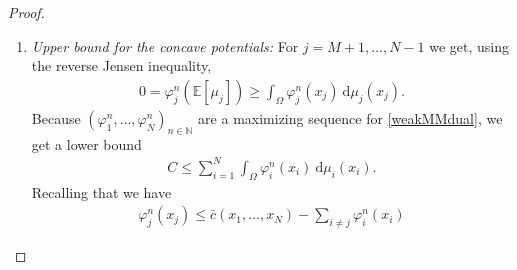 \documentclass[10pt,a4paper]{amsart}
\newcommand{\RR}{\mathbb{R}}
\newcommand{\NN}{\mathbb{N}}
\newcommand{\EE}{\mathbb{E}}
\newcommand{\dd}{\mathrm{d}}
\begin{document}
\begin{proof}
\begin{enumerate}
\begin{align*}
		\varphi_j^n(x_j)&\geq-\big(\lambda_j|\cdot|^p\big)^*(0)-\Big(\sum_{i\ne j}\inf_{x_i\in\Omega}\lambda_i|x_i-\cdot|^p-\varphi_i^n(x_i)\Big)^*(0)\\
		&=-\sup_{v_1\in\Omega}-\lambda_j|v_1|^p-\sup_{v_2\in\Omega}-\sum_{i\neq j}\inf_{x_i\in\Omega}\lambda_i|x_i-v_2|^p-\varphi_i^n(x_i)\\
		&=\inf_{v_1\in\Omega}\lambda_j|v_1|^p+\inf_{v_2\in\Omega}\sum_{i\neq j}\inf_{x_i\in\Omega}\lambda_i|x_i-v_2|^p-\varphi_i^n(x_i)\\
		&=\inf_{v_2\in\Omega}\sum_{i\neq j}\inf_{x_i\in\Omega}\lambda_i|x_i-v_2|^p-\varphi_i^n(x_i)=:C_1(n)
	\end{align*}
	and we also get
	\begin{align*}
		\varphi_j^n(x_j)&\leq\inf_{z\in\Omega}\lambda_j|x_j-z|^p+\sum_{i\neq j}\inf_{x_i\in\Omega}\lambda_i|x_i-z|^p-\varphi_i^n(x_i)\\
		&\leq \inf_{z\in\Omega}\lambda_j\text{diam}(\Omega)^p+\sum_{i\neq j}\inf_{x_i\in\Omega}\lambda_i|x_i-z|^p-\varphi_i^n(x_i)=:C+C_1(n)
	\end{align*}
	for some $C>0$ and we notice that $C_1(n)\in[-\infty,+\infty]$ does not depend on $x_j$ anymore.
	Because of $0=\varphi_j^n(\EE[\mu_j])$ we get
	\begin{gather*}
		C_1(n)\leq 0\leq C+C_1(n).
	\end{gather*}
	which shows equivalently that
	\begin{gather*}
		-C\leq C_1(n)\leq 0
	\end{gather*}
	and that therefore $-C\leq\varphi_j^n(x_j)\leq C$ with $C\in\RR$ independent of $n$ and $x_j$ (and it shows that replacing $\varphi_j^n$ by the bi-conjugate preserves continuity).
	\item \textit{Upper bound for the concave potentials:}
	For $j=M+1,\dots,N-1$ we get, using the reverse Jensen inequality,
	\begin{gather}\label{integralbound}
		0=\varphi_j^n(\EE[\mu_j])\geq\int_{\Omega}\varphi_j^n(x_j)\ \dd\mu_j(x_j).
	\end{gather}
	Because $(\varphi_1^n,\dots,\varphi_N^n)_{n\in\NN}$ are a maximizing sequence for \eqref{weakMMdual}, we get a lower bound
	\begin{gather}\label{lowerboundmaximization}
		C\leq\sum_{i=1}^N\int_{\Omega}\varphi_i^n(x_i)\ \dd\mu_i(x_i).
	\end{gather}
	Recalling that we have
	\begin{gather*}
		\varphi_j^n(x_j)\leq\bar c(x_1,\dots,x_N)-\sum_{i\neq j}\varphi_i^n(x_i)

\end{gather*}
\end{enumerate}
\end{proof}
\end{document}

